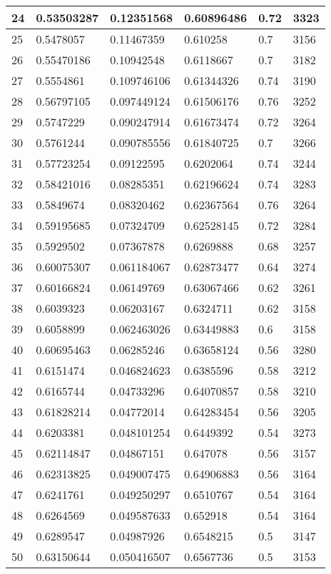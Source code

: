 \begin{longtable}{|l|l|l|l|l|l|}
24 & 0.53503287 & 0.12351568 & 0.60896486 & 0.72 & 3323 \\ \hline 
25 & 0.5478057 & 0.11467359 & 0.610258 & 0.7 & 3156 \\ \hline 
26 & 0.55470186 & 0.10942548 & 0.6118667 & 0.7 & 3182 \\ \hline 
27 & 0.5554861 & 0.109746106 & 0.61344326 & 0.74 & 3190 \\ \hline 
28 & 0.56797105 & 0.097449124 & 0.61506176 & 0.76 & 3252 \\ \hline 
29 & 0.5747229 & 0.090247914 & 0.61673474 & 0.72 & 3264 \\ \hline 
30 & 0.5761244 & 0.090785556 & 0.61840725 & 0.7 & 3266 \\ \hline 
31 & 0.57723254 & 0.09122595 & 0.6202064 & 0.74 & 3244 \\ \hline 
32 & 0.58421016 & 0.08285351 & 0.62196624 & 0.74 & 3283 \\ \hline 
33 & 0.5849674 & 0.08320462 & 0.62367564 & 0.76 & 3264 \\ \hline 
34 & 0.59195685 & 0.07324709 & 0.62528145 & 0.72 & 3284 \\ \hline 
35 & 0.5929502 & 0.07367878 & 0.6269888 & 0.68 & 3257 \\ \hline 
36 & 0.60075307 & 0.061184067 & 0.62873477 & 0.64 & 3274 \\ \hline 
37 & 0.60166824 & 0.06149769 & 0.63067466 & 0.62 & 3261 \\ \hline 
38 & 0.6039323 & 0.06203167 & 0.6324711 & 0.62 & 3158 \\ \hline 
39 & 0.6058899 & 0.062463026 & 0.63449883 & 0.6 & 3158 \\ \hline 
40 & 0.60695463 & 0.06285246 & 0.63658124 & 0.56 & 3280 \\ \hline 
41 & 0.6151474 & 0.046824623 & 0.6385596 & 0.58 & 3212 \\ \hline 
42 & 0.6165744 & 0.04733296 & 0.64070857 & 0.58 & 3210 \\ \hline 
43 & 0.61828214 & 0.04772014 & 0.64283454 & 0.56 & 3205 \\ \hline 
44 & 0.6203381 & 0.048101254 & 0.6449392 & 0.54 & 3273 \\ \hline 
45 & 0.62114847 & 0.04867151 & 0.647078 & 0.56 & 3157 \\ \hline 
46 & 0.62313825 & 0.049007475 & 0.64906883 & 0.56 & 3164 \\ \hline 
47 & 0.6241761 & 0.049250297 & 0.6510767 & 0.54 & 3164 \\ \hline 
48 & 0.6264569 & 0.049587633 & 0.652918 & 0.54 & 3164 \\ \hline 
49 & 0.6289547 & 0.04987926 & 0.6548215 & 0.5 & 3147 \\ \hline 
50 & 0.63150644 & 0.050416507 & 0.6567736 & 0.5 & 3153 \\ \hline 
\end{longtable}